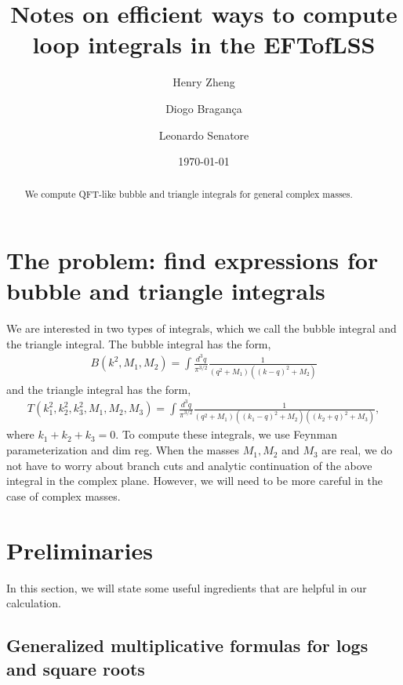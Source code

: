 \documentclass[twoside]{article}
\begin{document}
\title{Notes on efficient ways to compute loop integrals in the EFTofLSS}

\author{Henry Zheng \and
	Diogo Bragan\c{c}a \and
	Leonardo Senatore 
}


\date{\today}

\maketitle

\begin{abstract}
We compute QFT-like bubble and triangle integrals for general complex masses.
\end{abstract}

\tableofcontents

\section{The problem: find expressions for bubble and triangle integrals}
We are interested in two types of integrals, which we call the bubble integral and the triangle integral. The bubble integral has the form,
\begin{align}
B(k^2,M_1,M_2) =  \int \frac{d^3q}{\pi^{3/2}}\frac{1}{(q^2 + M_1)( (k-q)^2 + M_2)}
\end{align}
and the triangle integral has the form,
\begin{align}
T(k_1^2, k_2^2, k_3^2, M_1, M_2, M_3) =  \int \frac{d^3q}{\pi^{3/2}}\frac{1}{(q^2 + M_1)( (k_1-q)^2 + M_2)( (k_2 + q)^2 + M_3)},
\end{align}
where $k_1 + k_2 + k_3 = 0$.
To compute these integrals, we use Feynman parameterization and dim reg. When the masses $M_1,M_2$ and $M_3$ are real, we do not
have to worry about branch cuts and analytic continuation of the above integral in the complex plane. However, we will need to be more
careful in the case of complex masses. 


\section{Preliminaries}
\label{sec:prelim}

In this section, we will state some useful ingredients that are helpful in our calculation.

\subsection{Generalized multiplicative formulas for logs and square roots}
\end{document}
